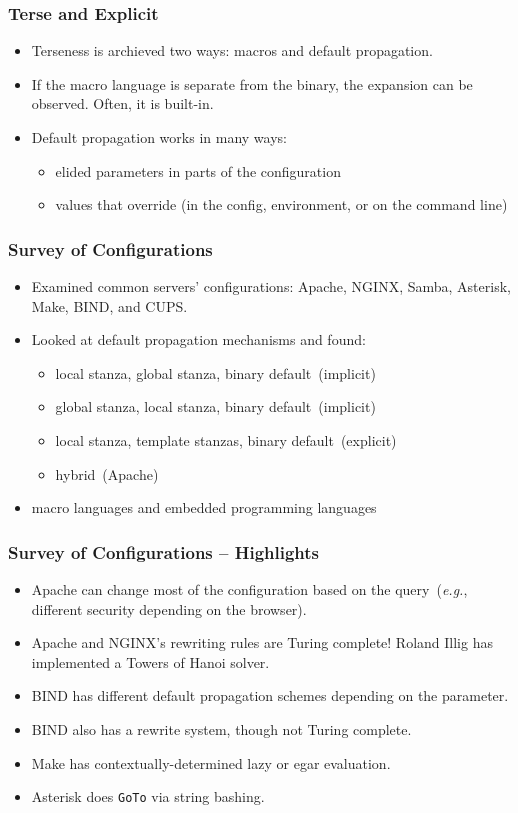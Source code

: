 \documentclass{beamer}
\begin{document}
\begin{frame}\frametitle{Terse and Explicit}
\begin{itemize}
\item Terseness is archieved two ways: macros and default propagation.
\item If the macro language is separate from the binary, the expansion can be observed. Often, it is built-in.
\item Default propagation works in many ways:
\begin{itemize}
\item elided parameters in parts of the configuration
\item values that override (in the config, environment, or on the command line)
\end{itemize}
\end{itemize}
\end{frame}

\begin{frame}\frametitle{Survey of Configurations}
\begin{itemize}
\item Examined common servers' configurations: Apache, NGINX, Samba, Asterisk, Make, BIND, and CUPS.
\item Looked at default propagation mechanisms and found:
\begin{itemize}
\item local stanza, global stanza, binary default~(implicit)
\item global stanza, local stanza, binary default~(implicit)
\item local stanza, template stanzas, binary default~(explicit)
\item hybrid~(Apache)
\end{itemize}
\item macro languages and embedded programming languages
\end{itemize}
\end{frame}

\begin{frame}\frametitle{Survey of Configurations -- Highlights}
\begin{itemize}
\item Apache can change most of the configuration based on the query~(\emph{e.g.}, different security depending on the browser).
\item Apache and NGINX's rewriting rules are Turing complete! Roland Illig has implemented a Towers of Hanoi solver.
\item BIND has different default propagation schemes depending on the parameter.
\item BIND also has a rewrite system, though not Turing complete.
\item Make has contextually-determined lazy or egar evaluation.
\item Asterisk does \texttt{GoTo} via string bashing.
\end{itemize}
\end{frame}
\end{document}
